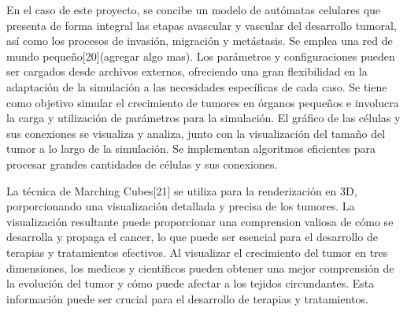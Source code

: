 \hspace{.1cm}En el caso de este proyecto, se concibe un modelo de autómatas celulares que presenta de forma integral las etapas avascular y vascular del desarrollo tumoral, así como los procesos de invasión, migración y metástasis. Se emplea una red de mundo pequeño[20](agregar algo mas). Los parámetros y configuraciones pueden ser cargados desde archivos externos, ofreciendo una gran flexibilidad en la adaptación de la simulación a las necesidades específicas de cada caso. Se tiene como objetivo simular el crecimiento de tumores en órganos pequeños e involucra la carga y utilización de parámetros para la simulación. El gráfico de las células y sus conexiones se visualiza y analiza, junto con la visualización del tamaño del tumor a lo largo de la simulación. Se implementan algoritmos eficientes para procesar grandes cantidades de células y sus conexiones.

\hspace{.1cm}La técnica de Marching Cubes[21] se utiliza para la renderizaci\'on en 3D, porporcionando una visualizaci\'on detallada y precisa de los tumores. La visualizaci\'on resultante puede proporcionar una comprension valiosa de cómo se desarrolla y propaga el cancer, lo que puede ser esencial para el desarrollo de terapias y tratamientos efectivos. Al visualizar el crecimiento del tumor en tres dimensiones, los me\'dicos y cient\'ificos pueden obtener una mejor comprensi\'on de la evoluci\'on del tumor y cómo puede afectar a los tejidos circundantes. Esta informaci\'on puede ser crucial para el desarrollo de terapias y tratamientos.


